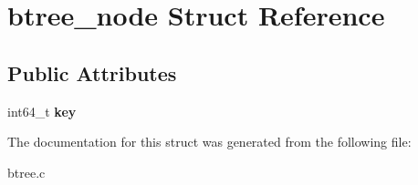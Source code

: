 \hypertarget{structbtree__node}{}\section{btree\+\_\+node Struct Reference}
\label{structbtree__node}
\subsection*{Public Attributes}
\begin{DoxyCompactItemize}
\item 
\mbox{\label{structbtree__node_ae9807c6d556e3443d00a86881b193254}} 
int64\+\_\+t {\bfseries key}
\end{DoxyCompactItemize}


The documentation for this struct was generated from the following file\+:\begin{DoxyCompactItemize}
\item 
btree.\+c\end{DoxyCompactItemize}
